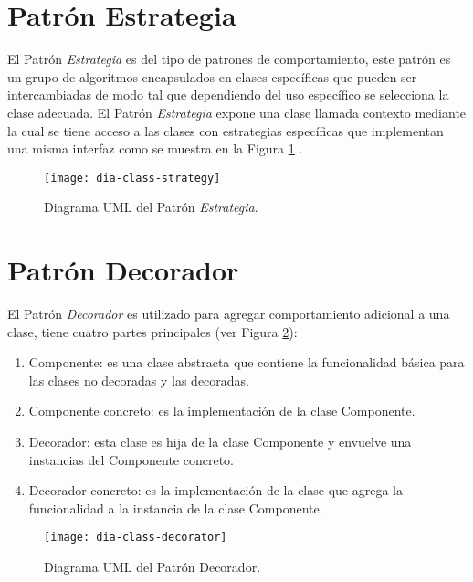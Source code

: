 \section{Patrón Estrategia}\label{sec:strategy}
El Patrón \textit{Estrategia} es del tipo de patrones de comportamiento, este patrón es un grupo de algoritmos encapsulados en clases específicas que pueden ser intercambiadas de modo tal que dependiendo del uso específico se selecciona la clase adecuada. El Patrón \textit{Estrategia} expone una clase llamada contexto mediante la cual se tiene acceso a las clases con estrategias específicas que implementan una misma interfaz como se muestra en la Figura \ref{fig:dia-class-strategy} \cite{DesignPatternsLasater, DesignPatterns}.

\begin{figure}[h]
  \centering
  \texttt{[image: dia-class-strategy]}
  \caption{Diagrama UML del Patrón \textit{Estrategia}\cite{DesignPatternsLasater}.}
  \label{fig:dia-class-strategy}
\end{figure}

\section{Patrón Decorador}\label{sec:decorator}
El Patrón \textit{Decorador} es utilizado para agregar comportamiento adicional a una clase, tiene cuatro partes principales\cite{DesignPatternsLasater} (ver Figura \ref{fig:dia-class-decorator}):
\begin{enumerate}
  \item Componente: es una clase abstracta que contiene la funcionalidad básica para las clases no decoradas y las decoradas.
  \item Componente concreto: es la implementación de la clase Componente.
  \item Decorador: esta clase es hija de la clase Componente y envuelve una instancias del Componente concreto.
  \item Decorador concreto: es la implementación de la clase que agrega la funcionalidad a la instancia de la clase Componente.
\end{enumerate}

\begin{figure}[h]
  \centering
  \texttt{[image: dia-class-decorator]}
  \caption{Diagrama UML del Patrón Decorador\cite{DesignPatternsLasater}.}
  \label{fig:dia-class-decorator}
\end{figure}

